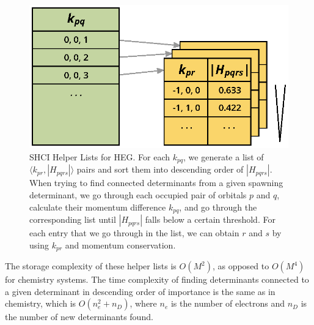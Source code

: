 \begin{figure}
  \begin{center}
  \includegraphics[width=0.9\linewidth]{figs/HelperList.eps}
  \end{center}
  \vspace{-0.2cm}
  \caption{SHCI Helper Lists for HEG.
  For each $k_{pq}$, we generate a list of $\langle k_{pr}, |H_{pqrs}|\rangle$ pairs and sort them into descending order of $|H_{pqrs}|$.
  When trying to find connected determinants from a given spawning determinant, we go through each occupied pair of orbitals $p$ and $q$, calculate their momentum difference $k_{pq}$, and go through the corresponding list until $|H_{pqrs}|$ falls below a certain threshold.
  For each entry that we go through in the list, we can obtain $r$ and $s$ by using $k_{pr}$ and momentum conservation.
  }
  \label{fig:helper}
\end{figure}

The storage complexity of these helper lists is $O(M^2)$, as opposed to $O(M^4)$ for chemistry systems.
The time complexity of finding determinants connected to a given determinant in descending order of importance is the same as in chemistry, which is $O(n_e^2 + n_D)$, where $n_e$ is the number of electrons and $n_D$ is the number of new determinants found.
